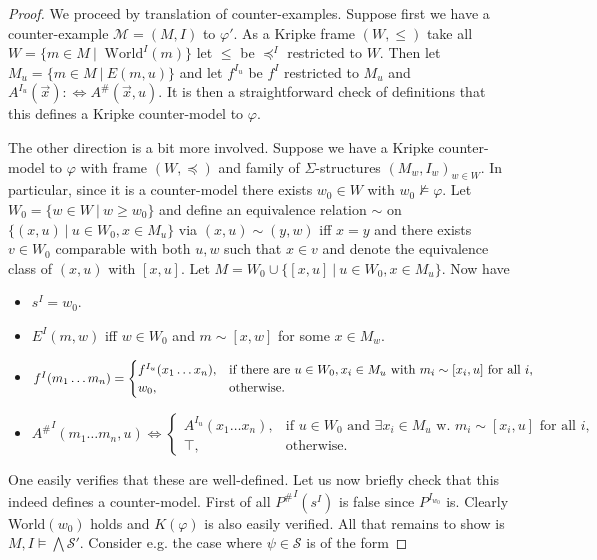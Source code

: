 \documentclass[a4paper,11pt]{report}
\theoremstyle{definition}
\theoremstyle{definition}
\theoremstyle{definition}
\theoremstyle{definition}
\theoremstyle{definition}
\theoremstyle{definition}
\theoremstyle{definition}
\begin{document}
	\begin{proof}
		We proceed by translation of counter-examples. Suppose first we have a counter-example $\mathcal M = (M, I)$ to $\varphi'$. As a Kripke frame $(W, \leq)$ take all $ W = \{m\in M\:|\:\text{ World}^I(m)\}$ let $\leq$ be $\preceq^I$ restricted to $W$. Then let $M_u = \{m\in M\:|\: E(m, u)\}$ and let $f^{I_u}$ be $f^I$ restricted to $M_u$ and $A^{I_u}(\vec x): \Leftrightarrow A^\#(\vec x, u)$. It is then a straightforward check of definitions that this defines a Kripke counter-model to $\varphi$.
		
		The other direction is a bit more involved. Suppose we have a Kripke counter-model to $\varphi$ with frame $(W, \preceq)$ and family of $\Sigma$-structures $(M_w, I_w)_{w\in W}$. In particular, since it is a counter-model there exists $w_0\in W$ with $w_0\not\models\varphi$. Let $W_0 = \{w\in W\:|\: w\geq w_0\}$ and define an equivalence relation $\sim$ on $\{(x, u)\:|\:u\in W_0, x\in M_u\}$ via $(x, u)\sim (y, w)$ iff $x = y$ and there exists $v\in W_0$ comparable with both $u, w$ such that $x\in v$ and denote the equivalence class of $(x, u)$ with $[x, u]$. Let $M = W_0\cup \{[x, u]\:|\:u\in W_0, x\in M_u\}$.
		Now have
		\begin{itemize}
			\item $s^I = w_0$.
			\item $E^I(m, w)$ iff $w\in W_0$ and $m \sim [x, w]$ for some $x\in M_w$.
			\item $f^I(m_1\dots m_n) =\begin{cases}
				f^{I_u}(x_1\dots x_n), &\text{if there are $ u\in W_0, x_i\in M_u$ with $m_i\sim [x_i, u]$ for all $i$,}\\
				w_0, & \text{otherwise.}
			\end{cases}$
			\item ${A^\#}^I(m_1\dots m_n, u) \Leftrightarrow\begin{cases}
				A^{I_u}(x_1\dots x_n), &\text{if $u\in W_0$ and $\exists x_i\in M_u$ w. $m_i\sim [x_i, u]$ for all $i$,}\\
				\top, & \text{otherwise.}
			\end{cases}$
		\end{itemize}
		One easily verifies that these are well-defined. Let us now briefly check that this indeed defines a counter-model. First of all ${P^\#}^I(s^I)$ is false since $P^{I_{w_0}}$ is. Clearly World$(w_0)$ holds and $K(\varphi)$ is also easily verified. All that remains to show is $M, I\models\bigwedge\mathcal S'$. Consider e.g. the case where $\psi\in\mathcal S$ is of the form

\end{proof}
\end{document}
